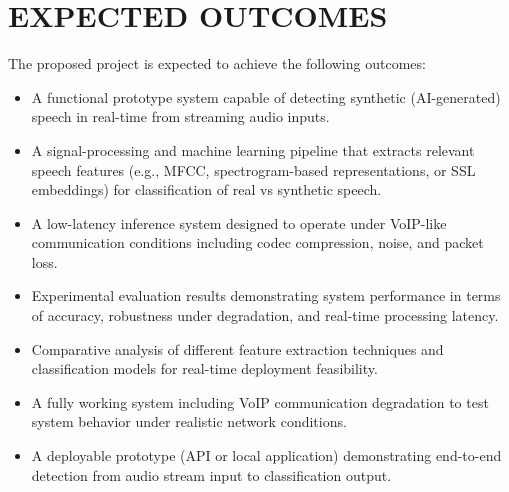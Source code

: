 \newpage
\section{EXPECTED OUTCOMES}

The proposed project is expected to achieve the following outcomes:

\begin{itemize}
    \item A functional prototype system capable of detecting synthetic (AI-generated) speech in real-time from streaming audio inputs.
    \item A signal-processing and machine learning pipeline that extracts relevant speech features (e.g., MFCC, spectrogram-based representations, or SSL embeddings) for classification of real vs synthetic speech.
    \item A low-latency inference system designed to operate under VoIP-like communication conditions including codec compression, noise, and packet loss.
    \item Experimental evaluation results demonstrating system performance in terms of accuracy, robustness under degradation, and real-time processing latency.
    \item Comparative analysis of different feature extraction techniques and classification models for real-time deployment feasibility.
    \item A fully working system including VoIP communication degradation to test system behavior under realistic network conditions.
    \item A deployable prototype (API or local application) demonstrating end-to-end detection from audio stream input to classification output.
\end{itemize}